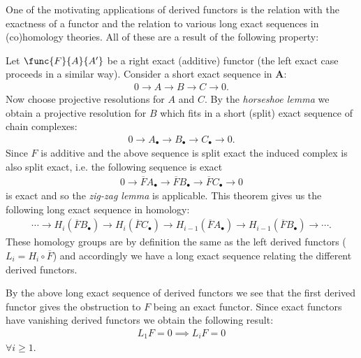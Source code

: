 	One of the motivating applications of derived functors is the relation with the exactness of a functor and the relation to various long exact sequences in (co)homology theories. All of these are a result of the following property:
	\begin{property}
		Let $\func{F}{A}{A'}$ be a right exact (additive) functor (the left exact case proceeds in a similar way). Consider a short exact sequence in $\mathbf{A}$:
		\begin{gather}
			0\longrightarrow A\longrightarrow B\longrightarrow C\longrightarrow 0.
		\end{gather}
		Now choose projective resolutions for $A$ and $C$. By the \textit{horseshoe lemma} we obtain a projective resolution for $B$ which fits in a short (split) exact sequence of chain complexes:
		\begin{gather}
			0\longrightarrow A_\bullet\longrightarrow B_\bullet\longrightarrow C_\bullet\longrightarrow 0.
		\end{gather}
		Since $F$ is additive and the above sequence is split exact the induced complex is also split exact, i.e. the following sequence is exact
		\begin{gather}
			0\longrightarrow\overline{F}A_\bullet\longrightarrow\overline{F}B_\bullet\longrightarrow\overline{F}C_\bullet\longrightarrow0
		\end{gather}
		is exact and so the \textit{zig-zag lemma} is applicable. This theorem gives us the following long exact sequence in homology:
		\begin{gather}
			\cdots\longrightarrow H_i(\overline{F}B_\bullet)\longrightarrow H_i(\overline{F}C_\bullet) \longrightarrow H_{i-1}(\overline{F}A_\bullet) \longrightarrow H_{i-1}(\overline{F}B_\bullet) \longrightarrow\cdots.
		\end{gather}
		These homology groups are by definition the same as the left derived functors ($L_i = H_i\circ\overline{F}$) and accordingly we have a long exact sequence relating the different derived functors.
	\end{property}
	\begin{result}
		By the above long exact sequence of derived functors we see that the first derived functor gives the obstruction to $F$ being an exact functor. Since exact functors have vanishing derived functors we obtain the following result:
		\begin{gather}
			L_1F = 0\implies L_iF=0
		\end{gather}
        $\forall i\geq 1$.
	\end{result}

